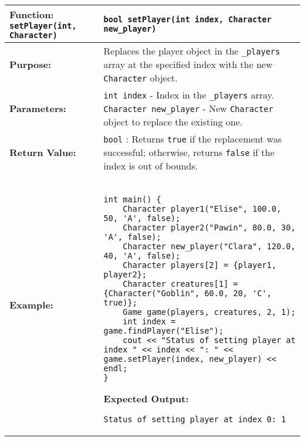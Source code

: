 \renewcommand{\arraystretch}{1.5}
\begin{longtable}{|p{1.7in}|p{4.3in}|}
\hline
\textbf{Function:} \texttt{setPlayer(int, Character)} & \texttt{bool setPlayer(int index, Character new_player)} \\ \hline

\textbf{Purpose:} & Replaces the player object in the \texttt{_players} array at the specified index with the new \texttt{Character} object. \\ \hline

\textbf{Parameters:} & 
\texttt{int index} - Index in the \texttt{_players} array. \newline
\texttt{Character new_player} - New \texttt{Character} object to replace the existing one. \\ \hline

\textbf{Return Value:} & \texttt{bool} : Returns \texttt{true} if the replacement was successful; otherwise, returns \texttt{false} if the index is out of bounds. \\ \hline

\textbf{Example:} & 

\begin{example}

\begin{verbatim}

int main() {
    Character player1("Elise", 100.0, 50, 'A', false);
    Character player2("Pawin", 80.0, 30, 'A', false);
    Character new_player("Clara", 120.0, 40, 'A', false);
    Character players[2] = {player1, player2};
    Character creatures[1] = {Character("Goblin", 60.0, 20, 'C', true)};
    Game game(players, creatures, 2, 1);
    int index = game.findPlayer("Elise");
    cout << "Status of setting player at index " << index << ": " << game.setPlayer(index, new_player) << endl;
}
\end{verbatim}
\end{example}

\textbf{Expected Output:} 

\vspace{5pt}
\texttt{Status of setting player at index 0: 1}
\vspace{5pt} \\ \hline
\end{longtable}


